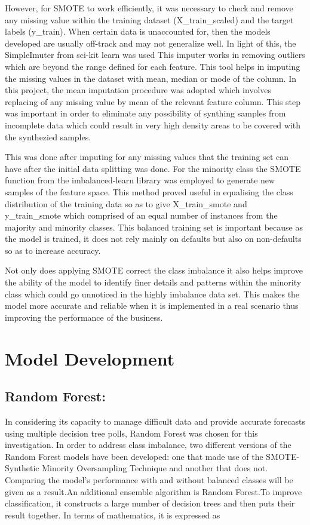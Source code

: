 \documentclass[12pt, a4paper,oneside]{book}
\numberwithin{equation}{section}
\begin{document}
However, for SMOTE to work efficiently, it was necessary to check and remove any missing value within the training dataset (X\_train\_scaled) and the target labels (y\_train). When certain data is unaccounted for, then the models developed are usually off-track and may not generalize well. In light of this, the SimpleImuter from sci-kit learn was used This imputer works in removing outliers which are beyond the range defined for each feature. This tool helps in imputing the missing values in the dataset with mean, median or mode of the column. In this project, the mean imputation procedure was adopted which involves replacing of any missing value by mean of the relevant feature column. This step was important in order to eliminate any possibility of synthing samples from incomplete data which could result in very high density areas to be covered with the synthezied samples. 

This was done after imputing for any missing values that the training set can have after the initial data splitting was done. For the minority class the SMOTE function from the imbalanced-learn library was employed to generate new samples of the feature space. This method proved useful in equalising the class distribution of the training data so as to give X\_train\_smote and y\_train\_smote which comprised of an equal number of instances from the majority and minority classes. This balanced training set is important because as the model is trained, it does not rely mainly on defaults but also on non-defaults so as to increase accuracy. 

Not only does applying SMOTE correct the class imbalance it also helps improve the ability of the model to identify finer details and patterns within the minority class which could go unnoticed in the highly imbalance data set. This makes the model more accurate and reliable when it is implemented in a real scenario thus improving the performance of the business.
 
\section{Model Development}

\subsection{Random Forest:}
In considering its capacity to manage difficult data and provide accurate forecasts using multiple decision tree polls, Random Forest was chosen for this investigation. In order to address class imbalance, two different versions of the Random Forest models have been developed: one that made use of the SMOTE-Synthetic Minority Oversampling Technique and another that does not. Comparing the model's performance with and without balanced classes will be given as a result.An additional ensemble algorithm is Random Forest.To improve classification, it constructs a large number of decision trees and then puts their result together. In terms of mathematics, it is expressed as
\end{document}

